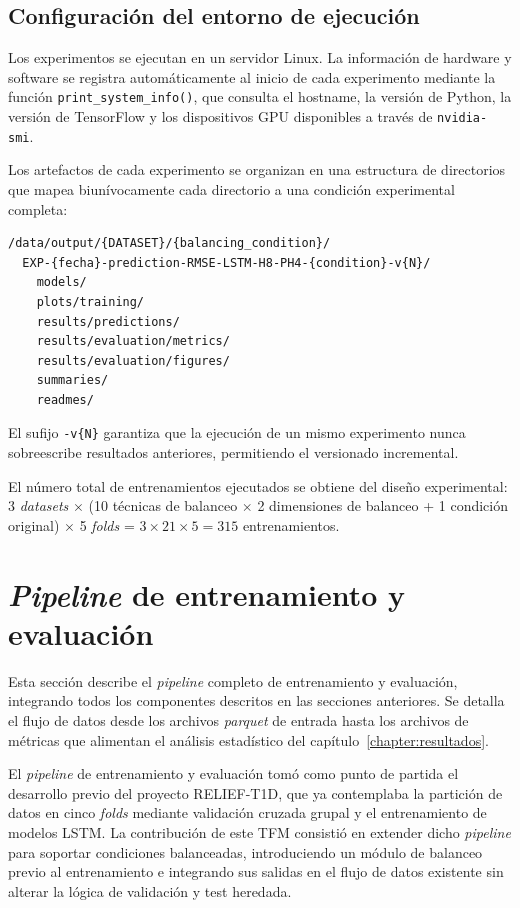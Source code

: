 \subsection{Configuración del entorno de ejecución}
\label{subsec:entorno_ejecucion}

Los experimentos se ejecutan en un servidor Linux. La información de hardware y software se registra automáticamente al inicio de cada experimento mediante la función \texttt{print\_system\_info()}, que consulta el hostname, la versión de Python, la versión de TensorFlow y los dispositivos GPU disponibles a través de \texttt{nvidia-smi}.

Los artefactos de cada experimento se organizan en una estructura de directorios que mapea biunívocamente cada directorio a una condición experimental completa:

\begin{verbatim}
/data/output/{DATASET}/{balancing_condition}/
  EXP-{fecha}-prediction-RMSE-LSTM-H8-PH4-{condition}-v{N}/
    models/
    plots/training/
    results/predictions/
    results/evaluation/metrics/
    results/evaluation/figures/
    summaries/
    readmes/
\end{verbatim}

El sufijo \texttt{-v\{N\}} garantiza que la ejecución de un mismo experimento nunca sobreescribe resultados anteriores, permitiendo el versionado incremental.

El número total de entrenamientos ejecutados se obtiene del diseño experimental: 3 \textit{datasets} $\times$ (10 técnicas de balanceo $\times$ 2 dimensiones de balanceo + 1 condición original) $\times$ 5 \textit{folds} = $3 \times 21 \times 5 = 315$ entrenamientos.

\section{\emph{Pipeline} de entrenamiento y evaluación}
\label{sec:pipeline_entrenamiento}
Esta sección describe el \textit{pipeline} completo de entrenamiento y evaluación, integrando todos los componentes descritos en las secciones anteriores. Se detalla el flujo de datos desde los archivos \textit{parquet} de entrada hasta los archivos de métricas que alimentan el análisis estadístico del capítulo~\ref{chapter:resultados}.

El \textit{pipeline} de entrenamiento y evaluación tomó como punto de partida el desarrollo previo del proyecto RELIEF-T1D, que ya contemplaba la partición de datos en cinco \textit{folds} mediante validación cruzada grupal y el entrenamiento de modelos LSTM. La contribución de este TFM consistió en extender dicho \textit{pipeline} para soportar condiciones balanceadas, introduciendo un módulo de balanceo previo al entrenamiento e integrando sus salidas en el flujo de datos existente sin alterar la lógica de validación y test heredada.
